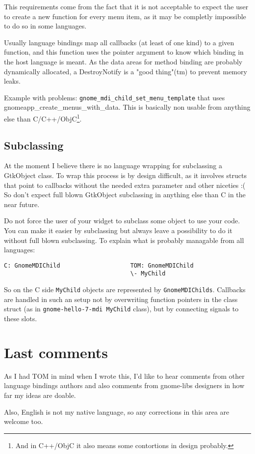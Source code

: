 \documentclass{article}
\begin{document}
This requirements come from the fact that it is not acceptable to
expect
the user to create a new function for every menu item, as it may be
completly impossible to do so in some languages.

Usually language bindings map all callbacks (at least of one kind) to a
    given function, and this function uses the pointer argument to
    know which binding in the host language is meant.  As the data
    areas for method binding are probably dynamically allocated, a
    DestroyNotify is a "good thing"(tm) to prevent memory leaks. 

Example with problems: {\tt gnome\_mdi\_child\_set\_menu\_template} that uses
    gnomeapp\_create\_menus\_with\_data. This is basically
    non usable from anything else than C/C++/ObjC\footnote{And in C++/ObjC it
    also means some contortions in design probably.}.

\subsection{Subclassing}
At the moment I believe there is
    no language wrapping for subclassing a GtkObject class. To wrap
    this process is by
    design difficult, as it involves structs that point to callbacks
    without the needed extra parameter and other niceties :( 
    So don't expect full blown GtkObject subclassing in anything else
    than C in the near future.

    Do not
    force the user of your widget to subclass some object to use your
    code. You can make it easier by subclassing but always leave a
    possibility to do it without full blown subclassing. To explain
    what is probably managable from all languages: 
\begin{verbatim}
C: GnomeMDIChild                    TOM: GnomeMDIChild 
                                    \- MyChild 
\end{verbatim}
So on the C side {\tt MyChild} objects are
    represented by {\tt GnomeMDIChilds}. Callbacks are handled in such an
    setup not by overwriting function pointers in the class struct (as
    in {\tt gnome-hello-7-mdi MyChild} class), but by connecting signals to
    these slots.

\section{Last comments}
As I had TOM in mind when I wrote this, I'd like to hear comments
from other language bindings authors and also comments from gnome-libs
designers in how far my ideas are doable.

Also, English is not my native language, so any corrections in this
area are welcome too.
\end{document}
